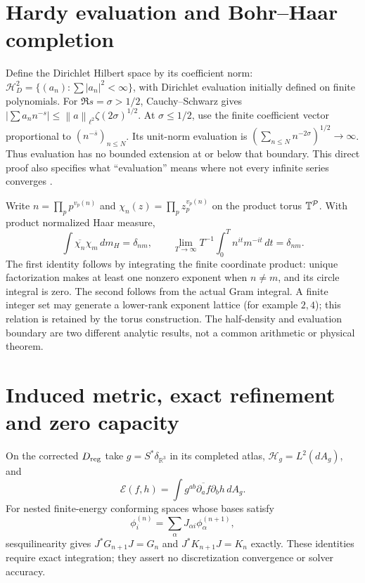 \documentclass[11pt]{article}
\theoremstyle{readable}
\theoremstyle{remark}\newtheorem{remark}[theorem]{Remark}
\newcommand{\R}{\mathbb R}\newcommand{\C}{\mathbb C}\newcommand{\Z}{\mathbb Z}
\newcommand{\dd}{\,d}\newcommand{\norm}[1]{\left\lVert#1\right\rVert}
\begin{document}
\section{Hardy evaluation and Bohr--Haar completion}\label{sec:hardy}
Define the Dirichlet Hilbert space by its coefficient norm:
$\mathcal H_D^2=\{(a_n):\sum|a_n|^2<\infty\}$, with Dirichlet evaluation
initially defined on finite polynomials. For $\Re s=\sigma>1/2$,
Cauchy--Schwarz gives
$|\sum a_nn^{-s}|\leq\norm{a}_{\ell^2}\zeta(2\sigma)^{1/2}$.
At $\sigma\leq1/2$, use the finite coefficient vector proportional to
$(n^{-\bar s})_{n\leq N}$. Its unit-norm evaluation is
$(\sum_{n\leq N}n^{-2\sigma})^{1/2}\to\infty$.
Thus evaluation has no bounded extension at or below that boundary.
This direct proof also specifies what ``evaluation'' means where not every
infinite series converges \cite{hardy}.

Write $n=\prod_p p^{v_p(n)}$ and
$\chi_n(z)=\prod_pz_p^{v_p(n)}$ on the product torus $\mathbb T^{\mathcal P}$.
With product normalized Haar measure,
\[
 \int\overline{\chi_n}\chi_m\dd m_H=\delta_{nm},\qquad
 \lim_{T\to\infty}T^{-1}\int_0^T n^{it}m^{-it}\dd t=\delta_{nm}.
\]
The first identity follows by integrating the finite coordinate product:
unique factorization makes at least one nonzero exponent when $n\ne m$,
and its circle integral is zero. The second follows from the actual Gram
integral. A finite integer set may generate a lower-rank exponent lattice
(for example $2,4$); this relation is retained by the torus construction.
The half-density and evaluation boundary are two different analytic results,
not a common arithmetic or physical theorem.

\section{Induced metric, exact refinement and zero capacity}\label{sec:capacity}
On the corrected $D_{\rm reg}$ take $g=S^*\delta_{\R^3}$ in its completed
atlas, $\mathcal H_g=L^2(dA_g)$, and
\[
 \mathcal E(f,h)=\int g^{ab}\overline{\partial_af}\partial_bh\dd A_g.
\]
For nested finite-energy conforming spaces whose bases satisfy
\[
 \phi_i^{(n)}=\sum_\alpha J_{\alpha i}\phi_\alpha^{(n+1)},
\]
sesquilinearity gives $J^*G_{n+1}J=G_n$ and $J^*K_{n+1}J=K_n$ exactly.
These identities require exact integration; they assert no discretization
convergence or solver accuracy.
\end{document}
